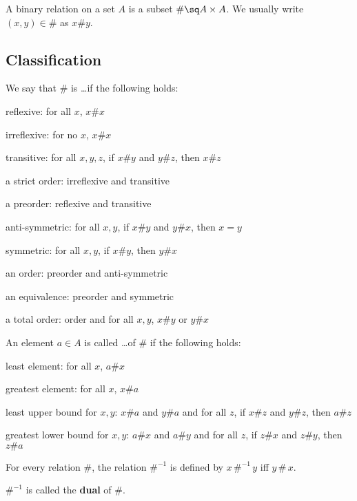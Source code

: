 A binary relation on a set $A$ is a subset $\#\sq A\times A$.
We usually write $(x,y)\in\#$ as $x\# y$.

\subsection{Classification}

\begin{definition}\label{def:math:binrel}
We say that $\#$ is \ldots if the following holds:
 \begin{compactitem}
 \item reflexive:  for all $x$, $x\# x$
 \item irreflexive:  for no $x$, $x\# x$
 \item transitive: for all $x,y,z$, if $x\# y$ and $y\# z$, then $x\# z$
 \item a strict order: irreflexive and transitive
 \item a preorder: reflexive and transitive
 \item anti-symmetric: for all $x,y$, if $x\# y$ and $y\# x$, then $x=y$
 \item symmetric: for all $x,y$, if $x\# y$, then $y\# x$
 \item an order\footnotemark: preorder and anti-symmetric
 \item an equivalence: preorder and symmetric
 \item a total order: order and for all $x,y$, $x\# y$ or $y\# x$
 \end{compactitem}

An element $a\in A$ is called \ldots of $\#$ if the following holds:
 \begin{compactitem}
  \item least element:  for all $x$, $a\# x$
  \item greatest element: for all $x$, $x\# a$
  \item least upper bound for $x,y$: $x\# a$ and $y\# a$ and for all $z$, if $x\# z$ and $y\# z$, then $a\# z$
  \item greatest lower bound for $x,y$: $a\# x$ and $a\# y$ and for all $z$, if $z\# x$ and $z\# y$, then $z\# a$
 \end{compactitem}
\end{definition}

\begin{definition}
For every relation $\#$, the relation $\#^{-1}$ is defined by $x\,\#^{-1}\, y$ iff $y\,\#\,x$.

$\#^{-1}$ is called the \textbf{dual} of $\#$.
\end{definition}

